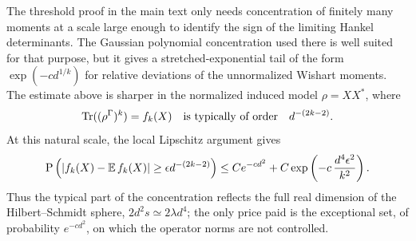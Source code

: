 \begin{remark}
The threshold proof in the main text only needs concentration of finitely many
moments at a scale large enough to identify the sign of the limiting Hankel
determinants.  The Gaussian polynomial concentration used there is well
suited for that purpose, but it gives a stretched-exponential tail of the form
\(\exp(-c d^{1/k})\) for relative deviations of the unnormalized Wishart
moments.  The estimate above is sharper in
the normalized induced model \(\rho=XX^*\), where
\[
    \operatorname{Tr}((\rho^\Gamma)^k)=f_k(X)
    \quad\text{is typically of order}\quad d^{-(2k-2)}.
\]
At this natural scale, the local Lipschitz argument gives
\[
    \operatorname{P}\left(
      |f_k(X)-\operatorname{\mathbb{E}} f_k(X)|\ge \epsilon d^{-(2k-2)}
    \right)
    \le
    C e^{-c d^2}
    +C\exp\left(-c\,\frac{d^4\epsilon^2}{k^2}\right).
\]
Thus the typical part of the concentration reflects the full real dimension
of the Hilbert--Schmidt sphere, \(2d^2s\simeq 2\lambda d^4\); the only price
paid is the exceptional set, of probability \(e^{-cd^2}\), on which the
operator norms are not controlled.
\end{remark}
